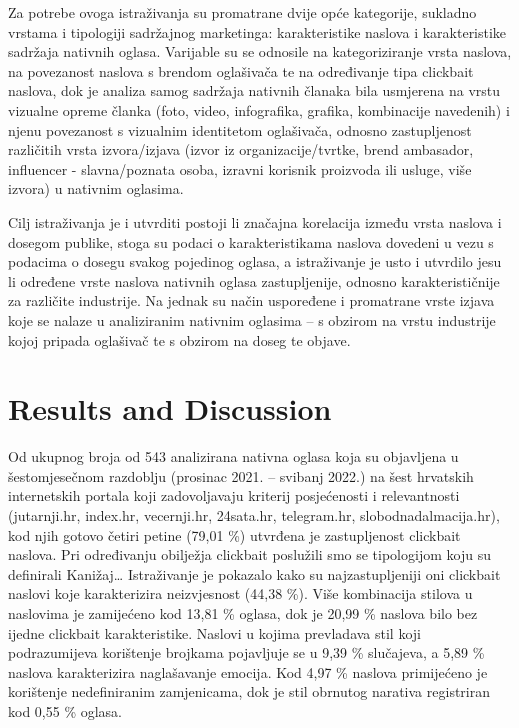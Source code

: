 \documentclass[preprint, 3p,
authoryear]{elsarticle} %
\begin{document}
Za potrebe ovoga istraživanja su promatrane dvije opće kategorije,
sukladno vrstama i tipologiji sadržajnog marketinga: karakteristike
naslova i karakteristike sadržaja nativnih oglasa. Varijable su se
odnosile na kategoriziranje vrsta naslova, na povezanost naslova s
brendom oglašivača te na određivanje tipa clickbait naslova, dok je
analiza samog sadržaja nativnih članaka bila usmjerena na vrstu vizualne
opreme članka (foto, video, infografika, grafika, kombinacije navedenih)
i njenu povezanost s vizualnim identitetom oglašivača, odnosno
zastupljenost različitih vrsta izvora/izjava (izvor iz
organizacije/tvrtke, brend ambasador, influencer - slavna/poznata osoba,
izravni korisnik proizvoda ili usluge, više izvora) u nativnim oglasima.

Cilj istraživanja je i utvrditi postoji li značajna korelacija između
vrsta naslova i dosegom publike, stoga su podaci o karakteristikama
naslova dovedeni u vezu s podacima o dosegu svakog pojedinog oglasa, a
istraživanje je usto i utvrdilo jesu li određene vrste naslova nativnih
oglasa zastupljenije, odnosno karakterističnije za različite industrije.
Na jednak su način uspoređene i promatrane vrste izjava koje se nalaze u
analiziranim nativnim oglasima -- s obzirom na vrstu industrije kojoj
pripada oglašivač te s obzirom na doseg te objave.

\hypertarget{results-and-discussion}{%
\section{Results and Discussion}\label{results-and-discussion}}

Od ukupnog broja od 543 analizirana nativna oglasa koja su objavljena u
šestomjesečnom razdoblju (prosinac 2021. -- svibanj 2022.) na šest
hrvatskih internetskih portala koji zadovoljavaju kriterij posjećenosti
i relevantnosti (jutarnji.hr, index.hr, vecernji.hr, 24sata.hr,
telegram.hr, slobodnadalmacija.hr), kod njih gotovo četiri petine (79,01
\%) utvrđena je zastupljenost clickbait naslova. Pri određivanju
obilježja clickbait poslužili smo se tipologijom koju su definirali
Kanižaj\ldots{} Istraživanje je pokazalo kako su najzastupljeniji oni
clickbait naslovi koje karakterizira neizvjesnost (44,38 \%). Više
kombinacija stilova u naslovima je zamijećeno kod 13,81 \% oglasa, dok
je 20,99 \% naslova bilo bez ijedne clickbait karakteristike. Naslovi u
kojima prevladava stil koji podrazumijeva korištenje brojkama pojavljuje
se u 9,39 \% slučajeva, a 5,89 \% naslova karakterizira naglašavanje
emocija. Kod 4,97 \% naslova primijećeno je korištenje nedefiniranim
zamjenicama, dok je stil obrnutog narativa registriran kod 0,55 \%
oglasa.
\end{document}

